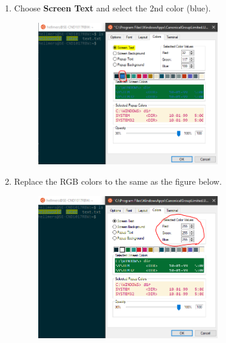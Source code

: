 \begin{enumerate}[a)]
\begin{enumerate}[1.]
        \item Choose \textbf{Screen Text} and select the 2nd color (blue).
        \begin{figure}[H]
            \centering
            \includegraphics[width=0.75\textwidth]{tex/WSL/Ubuntu_terminal_colors/Figures/6.PNG}
        \end{figure}
        
        \item Replace the RGB colors to the same as the figure below.
        \begin{figure}[H]
            \centering
            \includegraphics[width=0.75\textwidth]{tex/WSL/Ubuntu_terminal_colors/Figures/7.PNG}
        \end{figure}
        

\end{enumerate}
\end{enumerate}
